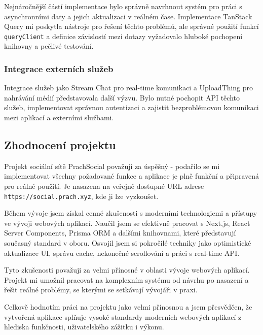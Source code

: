 \documentclass[12pt]{article}
\begin{document}
Nejnáročnější částí implementace bylo správně navrhnout systém pro práci s asynchronními daty a jejich aktualizaci v reálném čase. Implementace TanStack Query mi poskytla nástroje pro řešení těchto problémů, ale správné použití funkcí \texttt{queryClient} a definice závislostí mezi dotazy vyžadovalo hluboké pochopení knihovny a pečlivé testování.

\subsubsection{Integrace externích služeb}

Integrace služeb jako Stream Chat pro real-time komunikaci a UploadThing pro nahrávání médií představovala další výzvu. Bylo nutné pochopit API těchto služeb, implementovat správnou autentizaci a zajistit bezproblémovou komunikaci mezi aplikací a externími službami.

\subsection{Zhodnocení projektu}

Projekt sociální sítě PrachSocial považuji za úspěšný - podařilo se mi implementovat všechny požadované funkce a aplikace je plně funkční a připravená pro reálné použití. Je nasazena na veřejně dostupné URL adrese \texttt{https://social.prach.xyz}, kde ji lze vyzkoušet.

Během vývoje jsem získal cenné zkušenosti s moderními technologiemi a přístupy ve vývoji webových aplikací. Naučil jsem se efektivně pracovat s Next.js, React Server Components, Prisma ORM a dalšími knihovnami, které představují současný standard v oboru. Osvojil jsem si pokročilé techniky jako optimistické aktualizace UI, správu cache, nekonečné scrollování a práci s real-time API.

Tyto zkušenosti považuji za velmi přínosné v oblasti vývoje webových aplikací. Projekt mi umožnil pracovat na komplexním systému od návrhu po nasazení a řešit reálné problémy, se kterými se setkávají vývojáři v praxi.

Celkově hodnotím práci na projektu jako velmi přínosnou a jsem přesvědčen, že vytvořená aplikace splňuje vysoké standardy moderních webových aplikací z hlediska funkčnosti, uživatelského zážitku i výkonu.
\end{document}
